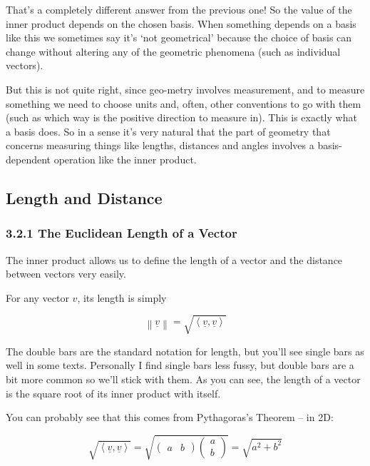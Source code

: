 \documentclass[oneside,english]{amsbook}
\numberwithin{section}{chapter}
\theoremstyle{plain}
\theoremstyle{definition}
\begin{document}
That's a completely different answer from the previous one! So the value
of the inner product depends on the chosen basis. When something depends
on a basis like this we sometimes say it's `not geometrical' because
the choice of basis can change without altering any of the geometric
phenomena (such as individual vectors).

But this is not quite right, since geo-metry involves measurement, and
to measure something we need to choose units and, often, other
conventions to go with them (such as which way is the positive direction
to measure in). This is exactly what a basis does. So in a sense it's
very natural that the part of geometry that concerns measuring things
like lengths, distances and angles involves a basis-dependent operation
like the inner product.

\subsection{Length and Distance}\label{length-and-distance}

\subsubsection{3.2.1 The Euclidean Length of a
	Vector}\label{the-euclidean-length-of-a-vector}

The inner product allows us to define the length of a vector and the
distance between vectors very easily.

For any vector $v$, its length is simply

\[\left\| \underline{v} \right\| = \sqrt{\left\langle \underline{v},\underline{v} \right\rangle}\]

The double bars are the standard notation for length, but you'll see
single bars as well in some texts. Personally I find single bars less
fussy, but double bars are a bit more common so we'll stick with them.
As you can see, the length of a vector is the square root of its inner
product with itself.

You can probably see that this comes from Pythagoras's Theorem -- in 2D:

\[\sqrt{\left\langle \underline{v},\underline{v} \right\rangle} = \sqrt{\begin{pmatrix}
		a & b
	\end{pmatrix}\begin{pmatrix}
		a \\
		b
\end{pmatrix}} = \sqrt{a^{2} + b^{2}}\]
\end{document}
